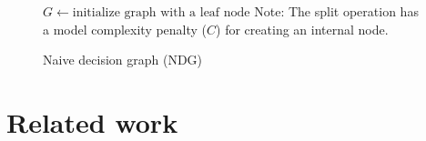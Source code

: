 \documentclass{article}
\begin{document}
\setlength{\columnsep}{0.05\textwidth}
\begin{wrapfigure}{R}{0.55\textwidth}
\vspace{-2mm}
\begin{minipage}{0.55\textwidth}
  \begin{algorithm}[H]
    \SetAlgoLined
    $G \gets \text{initialize graph with a leaf node}$\; 
    \scriptsize{Note: The split operation has a model complexity penalty ($C$) for creating an internal node.}
    \caption{Naive decision graph (NDG) \cite{oliver1992decision}}
  \end{algorithm}
\end{minipage}
\vspace{-3mm}
\end{wrapfigure}


\section{Related work}
\label{related}
\end{document}
